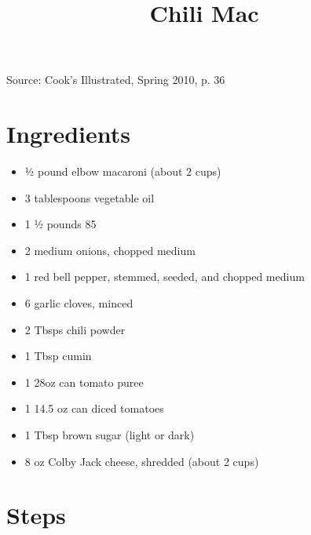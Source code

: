 \documentclass{article}
\title{Chili Mac}
\date{}
\begin{document}
\maketitle

Source: Cook's Illustrated, Spring 2010, p. 36

\section*{Ingredients}

\begin{itemize}
\item ½ pound elbow macaroni (about 2 cups)
\item 3 tablespoons vegetable oil
\item 1 ½ pounds 85%
\item 2 medium onions, chopped medium
\item 1 red bell pepper, stemmed, seeded, and chopped medium
\item 6 garlic cloves, minced
\item 2 Tbsps chili powder
\item 1 Tbsp cumin
\item 1 28oz can tomato puree
\item 1 14.5 oz can diced tomatoes
\item 1 Tbsp brown sugar (light or dark)
\item 8 oz Colby Jack cheese, shredded (about 2 cups)
\end{itemize}

\section*{Steps}
\end{document}
